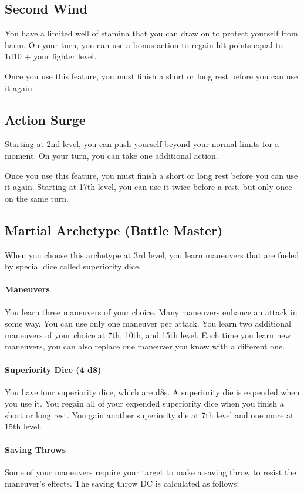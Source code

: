 {\subsection*{Second Wind}
You have a limited well of stamina that you can draw on to protect yourself from harm. On your turn, you can use a bonus action to regain hit points equal to 1d10 + your fighter level.

Once you use this feature, you must finish a short or long rest before you can use it again.
\subsection*{Action Surge}
Starting at 2nd level, you can push yourself beyond your normal limits for a moment. On your turn, you can take one additional action.

Once you use this feature, you must finish a short or long rest before you can use it again. Starting at 17th level, you can use it twice before a rest, but only once on the same turn.
\subsection*{Martial Archetype (Battle Master)}
When you choose this archetype at 3rd level, you learn maneuvers that are fueled by special dice called superiority dice.
\paragraph*{Maneuvers} You learn three maneuvers of your choice. Many maneuvers enhance an attack in some way. You can use only one maneuver per attack. You learn two additional maneuvers of your choice at 7th, 10th, and 15th level. Each time you learn new maneuvers, you can also replace one maneuver you know with a different one.
\paragraph*{Superiority Dice (4 d8)} You have four superiority dice, which are d8s. A superiority die is expended when you use it. You regain all of your expended superiority dice when you finish a short or long rest. You gain another superiority die at 7th level and one more at 15th level.

\paragraph*{Saving Throws} Some of your maneuvers require your target to make a saving throw to resist the maneuver's effects. The saving throw DC is calculated as follows:

}
